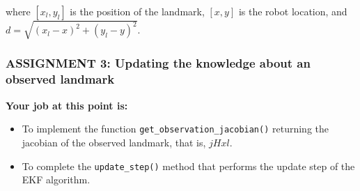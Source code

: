 \documentclass[11pt]{article}
\providecommand{\tightlist}{%
      \setlength{\itemsep}{0pt}\setlength{\parskip}{0pt}}
\begin{document}
where \([x_l,y_l]\) is the position of the landmark, \([x,y]\) is the
robot location, and \(d=\sqrt{(x_l-x)^2 + (y_l-y)^2}\).

    \hypertarget{assignment-3-updating-the-knowledge-about-an-observed-landmark}{%
\subsubsection{\texorpdfstring{\textbf{{ASSIGNMENT 3: Updating the
knowledge about an observed
landmark}}}{ASSIGNMENT 3: Updating the knowledge about an observed landmark}}\label{assignment-3-updating-the-knowledge-about-an-observed-landmark}}

\textbf{Your job at this point is:}

\begin{itemize}
\tightlist
\item
  To implement the function \texttt{get\_observation\_jacobian()}
  returning the jacobian of the observed landmark, that is, \(jHxl\).
\item
  To complete the \texttt{update\_step()} method that performs the
  update step of the EKF algorithm.
\end{itemize}
\end{document}
